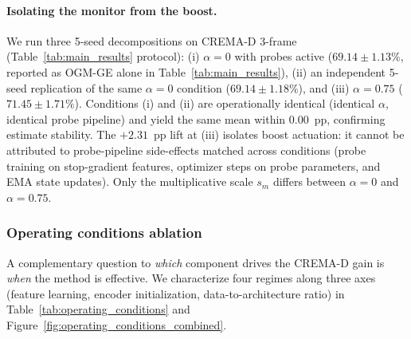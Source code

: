 \documentclass{article} %
\begin{document}
\paragraph{Isolating the monitor from the boost.} We run three 5-seed decompositions on CREMA-D 3-frame (Table~\ref{tab:main_results} protocol): (i) $\alpha{=}0$ with probes active ($69.14 \pm 1.13\%$, reported as OGM-GE alone in Table~\ref{tab:main_results}), (ii) an independent 5-seed replication of the same $\alpha{=}0$ condition ($69.14 \pm 1.18\%$), and (iii) $\alpha{=}0.75$ ($71.45 \pm 1.71\%$). Conditions (i) and (ii) are operationally identical (identical $\alpha$, identical probe pipeline) and yield the same mean within $0.00$~pp, confirming estimate stability. The $+2.31$~pp lift at (iii) isolates boost actuation: it cannot be attributed to probe-pipeline side-effects matched across conditions (probe training on stop-gradient features, optimizer steps on probe parameters, and EMA state updates). Only the multiplicative scale $s_m$ differs between $\alpha{=}0$ and $\alpha{=}0.75$.
\vspace{-1em}


\subsubsection{Operating conditions ablation}
\label{sec:operating_conditions}
\vspace{-1em}

A complementary question to \emph{which} component drives the CREMA-D gain is \emph{when} the method is effective. We characterize four regimes along three axes (feature learning, encoder initialization, data-to-architecture ratio) in Table~\ref{tab:operating_conditions} and Figure~\ref{fig:operating_conditions_combined}.
\end{document}
